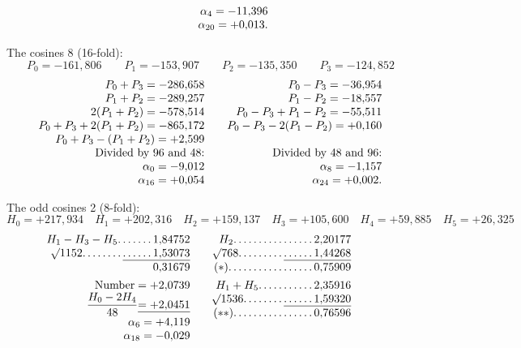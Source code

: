 \begin{landscape}
\[\begin{array}{@{}r@{\qquad}r@{\qquad}r@{}}
&&\alpha_4=-11{,}396\\
&&\alpha_{20}=+0{,}013.
\end{array}
\]
\par\noindent\hspace*{\parindent}The cosines 8 (16-fold):
\[P_0=-161{,}806\qquad P_1=-153{,}907\qquad P_2=-135{,}350\qquad P_3=-124{,}852\]
\[
\begin{array}{@{}r@{\qquad}r@{}}
P_0+P_3=-286{,}658&P_0-P_3=-36{,}954\\
P_1+P_2=-289{,}257&P_1-P_2=-18{,}557\\
2(P_1+P_2)=-578{,}514&P_0-P_3+P_1-P_2=-55{,}511\\
P_0+P_3+2(P_1+P_2)=-865{,}172&P_0-P_3-2(P_1-P_2)=+0{,}160\\
P_0+P_3-(P_1+P_2)=+2{,}599&\\
\text{Divided by 96 and 48:}&\text{Divided by 48 and 96:}\\
\alpha_0=-9{,}012&\alpha_8=-1{,}157\\
\alpha_{16}=+0{,}054&\alpha_{24}=+0{,}002.
\end{array}
\]
\par\noindent\hspace*{\parindent}The odd cosines 2 (8-fold):
\[H_0=+217{,}934\quad H_1=+202{,}316\quad H_2=+159{,}137\quad H_3=+105{,}600\quad H_4=+59{,}885\quad H_5=+26{,}325\]
\[
\begin{array}{@{}r@{\qquad}r@{\qquad}r@{}}
\begin{array}[t]{@{}r@{}}
H_1-H_3-H_5\VfourDots{6}1{,}84752\\
\BareRoot{1152}\VfourDots{7}\underline{\VfourDots{5}1{,}53073}\\
0{,}31679\\[4pt]
\text{Number}=+2{,}0739\\
\dfrac{H_0-2H_4}{48}\underline{=+2{,}0451}\\
\alpha_6=+4{,}119\\
\alpha_{18}=-0{,}029
\end{array}
&\begin{array}[t]{@{}r@{}}
H_2\VfourDots{15}2{,}20177\\
\BareRoot{768}\VfourDots{8}\underline{\VfourDots{5}1{,}44268}\\
(*)\VfourDots{16}0{,}75909\\[4pt]
H_1+H_5\VfourDots{10}2{,}35916\\
\BareRoot{1536}\VfourDots{7}\underline{\VfourDots{5}1{,}59320}\\
(**)\VfourDots{15}0{,}76596\\[4pt]

\end{array}
\end{array}\]
\end{landscape}
